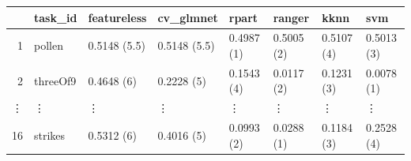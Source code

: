 \begin{table}[ht]
\centering
\begin{tabular}{rlllllll}
  \hline
 & task\_id & featureless & cv\_glmnet & rpart & ranger & kknn & svm \\
  \hline
1 & pollen & 0.5148 (5.5) & 0.5148 (5.5) & 0.4987 (1) & 0.5005 (2) & 0.5107 (4) & 0.5013 (3) \\
  2 & threeOf9 & 0.4648 (6) & 0.2228 (5) & 0.1543 (4) & 0.0117 (2) & 0.1231 (3) & 0.0078 (1) \\
  \vdots & \vdots & \vdots & \vdots & \vdots & \vdots & \vdots & \vdots \\
    16 & strikes & 0.5312 (6) & 0.4016 (5) & 0.0993 (2) & 0.0288 (1) & 0.1184 (3) & 0.2528 (4) \\
   \hline
\end{tabular}
\end{table}
